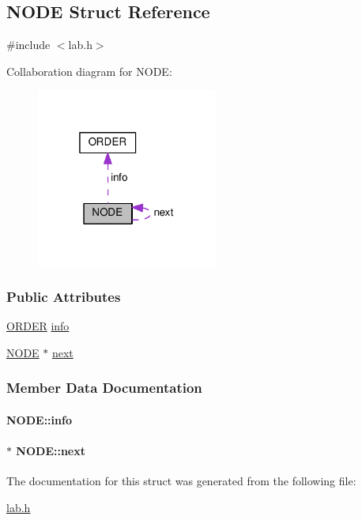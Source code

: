 \hypertarget{structNODE}{\subsection{N\+O\+D\+E Struct Reference}
\label{structNODE}
}


{\ttfamily \#include $<$lab.\+h$>$}



Collaboration diagram for N\+O\+D\+E\+:\nopagebreak
\begin{figure}[H]
\begin{center}
\leavevmode
\includegraphics[width=169pt]{structNODE__coll__graph}
\end{center}
\end{figure}
\subsubsection*{Public Attributes}
\begin{DoxyCompactItemize}
\item 
\hyperlink{structORDER}{O\+R\+D\+E\+R} \hyperlink{structNODE_a8ae24fb8df6ea326ce23cab9331efdd6}{info}
\item 
\hyperlink{structNODE}{N\+O\+D\+E} $\ast$ \hyperlink{structNODE_a078472e8ab2d2fe38e052f5c2a425618}{next}
\end{DoxyCompactItemize}


\subsubsection{Member Data Documentation}
\hypertarget{structNODE_a8ae24fb8df6ea326ce23cab9331efdd6}{
\paragraph[{info}]{ N\+O\+D\+E\+::info}}\label{structNODE_a8ae24fb8df6ea326ce23cab9331efdd6}
\hypertarget{structNODE_a078472e8ab2d2fe38e052f5c2a425618}{
\paragraph[{next}]{$\ast$ N\+O\+D\+E\+::next}}\label{structNODE_a078472e8ab2d2fe38e052f5c2a425618}


The documentation for this struct was generated from the following file\+:\begin{DoxyCompactItemize}
\item 
\hyperlink{lab_8h}{lab.\+h}\end{DoxyCompactItemize}
